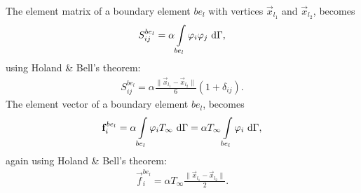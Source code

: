 The element matrix of a boundary element $be_l$ with vertices $\vec{x}_{l_1}$ and $\vec{x}_{l_2}$, becomes
\begin{gather*}
    S_{ij}^{be_l} = \alpha \int\displaylimits_{be_l}\varphi_i \varphi_j~\text{d}\Gamma,
\end{gather*} using Holand \& Bell's theorem:
\begin{gather}
    S_{ij}^{be_l} = \alpha \frac{\lVert \vec{x}_{l_1} - \vec{x}_{l_2} \rVert}{6} \left( 1 + \delta_{ij} \right).
\end{gather}
The element vector of a boundary element $be_l$, becomes
\begin{gather*}
    \vec{f}_i^{be_l} = \alpha \int\displaylimits_{be_l}\varphi_i T_{\infty}~\text{d}\Gamma = \alpha T_{\infty} \int\displaylimits_{be_l}\varphi_i~\text{d}\Gamma,
\end{gather*} again using Holand \& Bell's theorem:
\begin{gather}
    \vec{f}_i^{be_l} = \alpha T_{\infty} \frac{\lVert \vec{x}_{l_1} - \vec{x}_{l_2} \rVert}{2}.
\end{gather}